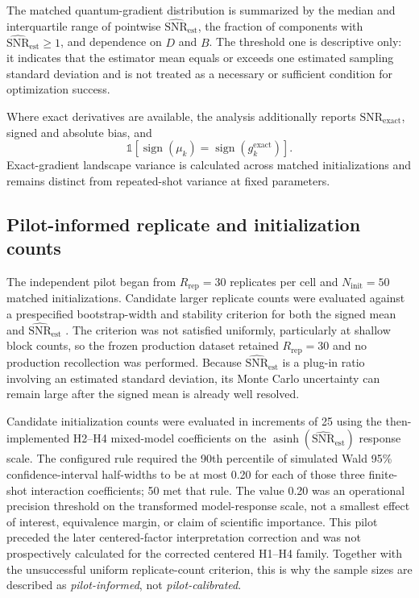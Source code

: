 \documentclass[pdflatex,sn-mathphys-num,Numbered]{sn-jnl}
\newcommand{\snrest}{\widehat{\mathrm{SNR}}_{\mathrm{est}}}
\newcommand{\snrexact}{\mathrm{SNR}_{\mathrm{exact}}}
\begin{document}
The matched quantum-gradient distribution is summarized by the median and interquartile range of pointwise $\snrest$, the fraction of components with $\snrest\ge1$, and dependence on $D$ and $B$. The threshold one is descriptive only: it indicates that the estimator mean equals or exceeds one estimated sampling standard deviation and is not treated as a necessary or sufficient condition for optimization success.

Where exact derivatives are available, the analysis additionally reports $\snrexact$, signed and absolute bias, and
\[
\mathbb{1}\!\left[
\operatorname{sign}(\mu_k)
=\operatorname{sign}(g_k^{\mathrm{exact}})
\right].
\]
Exact-gradient landscape variance is calculated across matched initializations and remains distinct from repeated-shot variance at fixed parameters.

\subsection{Pilot-informed replicate and initialization counts}
\label{sec:calibration}

The independent pilot began from $R_{\mathrm{rep}}=30$ replicates per cell and $N_{\mathrm{init}}=50$ matched initializations. Candidate larger replicate counts were evaluated against a prespecified bootstrap-width and stability criterion for both the signed mean and $\snrest$ \cite{davison1997bootstrap,tamiya2022stochastic}. The criterion was not satisfied uniformly, particularly at shallow block counts, so the frozen production dataset retained $R_{\mathrm{rep}}=30$ and no production recollection was performed. Because $\snrest$ is a plug-in ratio involving an estimated standard deviation, its Monte Carlo uncertainty can remain large after the signed mean is already well resolved.

Candidate initialization counts were evaluated in increments of 25 using the then-implemented H2--H4 mixed-model coefficients on the $\operatorname{asinh}(\snrest)$ response scale. The configured rule required the 90th percentile of simulated Wald 95\% confidence-interval half-widths to be at most 0.20 for each of those three finite-shot interaction coefficients; 50 met that rule. The value 0.20 was an operational precision threshold on the transformed model-response scale, not a smallest effect of interest, equivalence margin, or claim of scientific importance. This pilot preceded the later centered-factor interpretation correction and was not prospectively calculated for the corrected centered H1--H4 family. Together with the unsuccessful uniform replicate-count criterion, this is why the sample sizes are described as \emph{pilot-informed}, not \emph{pilot-calibrated}.
\end{document}
